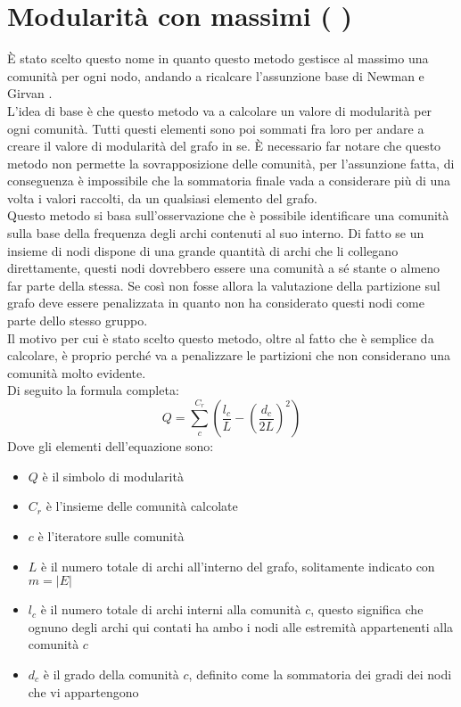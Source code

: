 \section{Modularità con massimi ( \mmax )}
È stato scelto questo nome in quanto questo metodo gestisce al massimo una comunità per ogni nodo, andando a ricalcare l'assunzione base di Newman e Girvan .\\
L'idea di base è che questo metodo va a calcolare un valore di modularità per ogni comunità. Tutti questi elementi sono poi sommati fra loro per andare a creare il valore di modularità del grafo in se. È necessario far notare che questo metodo non permette la sovrapposizione delle comunità, per l'assunzione fatta, di conseguenza è impossibile che la sommatoria finale vada a considerare più di una volta i valori raccolti, da un qualsiasi elemento del grafo.\\
Questo metodo si basa sull'osservazione che è possibile identificare una comunità sulla base della frequenza degli archi contenuti al suo interno. Di fatto se un insieme di nodi dispone di una grande quantità di archi che li collegano direttamente, questi nodi dovrebbero essere una comunità a sé stante o almeno far parte della stessa. Se così non fosse allora la valutazione della partizione sul grafo deve essere penalizzata in quanto non ha considerato questi nodi come parte dello stesso gruppo.\\
Il motivo per cui è stato scelto questo metodo, oltre al fatto che è semplice da calcolare, è proprio perché va a penalizzare le partizioni che non considerano una comunità molto evidente.\\
Di seguito la formula completa:
\begin{equation}
	Q=\sum_{c}^{C_r} \left( \frac{l_c}{L}-\left(\frac{d_c}{2L} \right)^2 \right)
	\label{eq:m_max}
\end{equation}
Dove gli elementi dell'equazione sono:
\begin{itemize}
	\item $Q$ è il simbolo di modularità
	\item $C_r$ è l'insieme delle comunità calcolate
	\item $c$ è l'iteratore sulle comunità
	\item $L$ è il numero totale di archi all'interno del grafo, solitamente indicato con $m=|E|$
	\item $l_c$ è il numero totale di archi interni alla comunità $c$, questo significa che ognuno degli archi qui contati ha ambo i nodi alle estremità appartenenti alla comunità $c$
	\item $d_c$ è il grado della comunità $c$, definito come la sommatoria dei gradi dei nodi che vi appartengono
\end{itemize}
